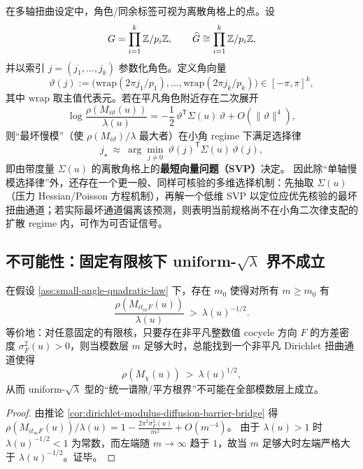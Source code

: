 \begin{remark}\label{rem:tax-near-coboundary-svp}
在多轴扭曲设定中，角色/同余标签可视为离散角格上的点。设
$$
G=\prod_{i=1}^k\mathbb{Z}/p_i\mathbb{Z},\qquad
\widehat G\cong \prod_{i=1}^k\mathbb{Z}/p_i\mathbb{Z},
$$
并以索引 \(j=(j_1,\dots,j_k)\) 参数化角色。定义角向量
$$
\vartheta(j):=\bigl(\mathrm{wrap}(2\pi j_1/p_1),\dots,\mathrm{wrap}(2\pi j_k/p_k)\bigr)\in[-\pi,\pi]^k,
$$
其中 \(\mathrm{wrap}\) 取主值代表元。若在平凡角色附近存在二次展开
$$
\log\frac{\rho(M_{i\vartheta}(u))}{\lambda(u)}
=-\frac12\,\vartheta^{\mathsf T}\Sigma(u)\,\vartheta+O(\|\vartheta\|^4),
$$
则“最坏慢模”（使 \(\rho(M_{i\vartheta})/\lambda\) 最大者）在小角 regime 下满足选择律
$$
j_\star\ \approx\ \arg\min_{j\neq 0}\ \vartheta(j)^{\mathsf T}\Sigma(u)\,\vartheta(j),
$$
即由带度量 \(\Sigma(u)\) 的离散角格上的\textbf{最短向量问题（SVP）}决定。
因此除“单轴慢模选择律”外，还存在一个更一般、同样可核验的多维选择机制：先抽取 \(\Sigma(u)\)（压力 Hessian/Poisson 方程机制），再解一个低维 SVP 以定位应优先核验的最坏扭曲通道；若实际最坏通道偏离该预测，则表明当前规格尚不在小角二次律支配的扩散 regime 内，可作为可否证信号。
\end{remark}

\subsection{不可能性：固定有限核下 uniform-\texorpdfstring{$\sqrt{\lambda}$}{sqrt(lambda)} 界不成立}\label{subsec:uniform-sqrt-no-go}

\begin{corollary}\label{cor:abelian-tower-no-go-bridge}
在假设 \ref{ass:small-angle-quadratic-law} 下，存在 \(m_0\) 使得对所有 \(m\ge m_0\) 有
$$
\frac{\rho(M_{it_mF}(u))}{\lambda(u)}\ >\ \lambda(u)^{-1/2}.
$$
等价地：对任意固定的有限核，只要存在非平凡整数值 cocycle 方向 \(F\) 的方差密度 \(\sigma_F^2(u)>0\)，则当模数层 \(m\) 足够大时，总能找到一个非平凡 Dirichlet 扭曲通道使得
$$
\rho(M_{\chi}(u))\ >\ \lambda(u)^{1/2},
$$
从而 uniform-\(\sqrt{\lambda}\) 型的“统一谱隙/平方根界”不可能在全部模数层上成立。
\end{corollary}
\begin{proof}
由推论 \ref{cor:dirichlet-modulus-diffusion-barrier-bridge} 得
$
\rho(M_{it_mF}(u))/\lambda(u)=1-\frac{2\pi^2\sigma_F^2(u)}{m^2}+O(m^{-4})
$。
由于 \(\lambda(u)>1\) 时 \(\lambda(u)^{-1/2}<1\) 为常数，而左端随 \(m\to\infty\) 趋于 \(1\)，故当 \(m\) 足够大时左端严格大于 \(\lambda(u)^{-1/2}\)。证毕。
\end{proof}


